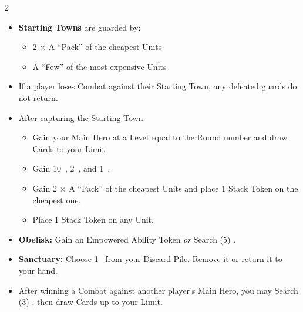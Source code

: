 \begin{multicols}{2}
\begin{itemize}
  \item \textbf{Starting Towns} are guarded by:
  \begin{itemize}
    \item 2 × A ``Pack'' of the cheapest  Units
    \item A ``Few'' of the most expensive  Units
  \end{itemize}
  \item If a player loses Combat against their Starting Town, any defeated guards do not return.
  \item After capturing the Starting Town:
  \begin{itemize}
    \item Gain your Main Hero at a Level equal to the Round number and draw Cards to your  Limit.
    \item Gain 10~, 2~, and 1~.
    \item Gain 2 × A ``Pack'' of the cheapest  Units and place 1 Stack Token on the cheapest one.
    \item Place 1 Stack Token on any  Unit.
  \end{itemize}
  \item \textbf{Obelisk:} Gain an Empowered Ability Token \textit{or} Search (5) .
  \item \textbf{Sanctuary:} Choose 1~ from your Discard Pile. Remove it or return it to your hand.
  \item After winning a Combat against another player's Main Hero, you may Search (3) , then draw Cards up to your  Limit.
  \end{itemize}

\end{multicols}


